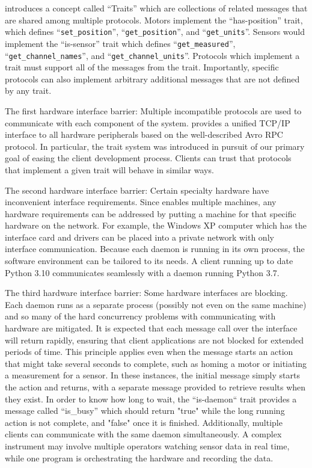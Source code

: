 \yaq{} introduces a concept called ``Traits'' which are collections of related messages that are shared among multiple protocols.
Motors implement the ``has-position'' trait, which defines ``\texttt{set\_position}'', ``\texttt{get\_position}'', and ``\texttt{get\_units}''.
Sensors would implement the ``is-sensor'' trait which defines ``\texttt{get\_measured}'', ``\texttt{get\_channel\_names}'', and ``\texttt{get\_channel\_units}''. 
Protocols which implement a trait must support all of the messages from the trait.
Importantly, specific protocols can also implement arbitrary additional messages that are not defined by any trait.

The first hardware interface barrier: Multiple incompatible protocols are used to communicate with each component of the system.
\yaq{} provides a unified TCP/IP interface to all hardware peripherals based on the well-described Avro RPC protocol.
In particular, the trait system was introduced in pursuit of our primary goal of easing the client development process.
Clients can trust that protocols that implement a given trait will behave in similar ways.

The second hardware interface barrier: Certain specialty hardware have inconvenient interface requirements.
Since \yaq{} enables multiple machines, any hardware requirements can be addressed by putting a machine for that specific hardware on the network.
For example, the Windows XP computer which has the interface card and drivers can be placed into a private network with only \yaq{} interface communication.
Because each \yaq{} daemon is running in its own process, the software environment can be tailored to its needs.
A client running up to date Python 3.10 communicates seamlessly with a daemon running Python 3.7.

The third hardware interface barrier: Some hardware interfaces are blocking.
Each \yaq{} daemon runs as a separate process (possibly not even on the same machine) and so many of the hard concurrency problems with communicating with hardware are mitigated.
It is expected that each message call over the \yaq{} interface will return rapidly, ensuring that client applications are not blocked for extended periods of time.
This principle applies even when the message starts an action that might take several seconds to complete, such as homing a motor or initiating a measurement for a sensor.
In these instances, the initial message simply starts the action and returns, with a separate message provided to retrieve results when they exist.
In order to know how long to wait, the ``is-daemon`` trait provides a message called ``is\_busy'' which should return "true" while the long running action is not complete, and "false" once it is finished.
Additionally, multiple clients can communicate with the same daemon simultaneously.
A complex instrument may involve multiple operators watching sensor data in real time, while one program is orchestrating the hardware and recording the data.


